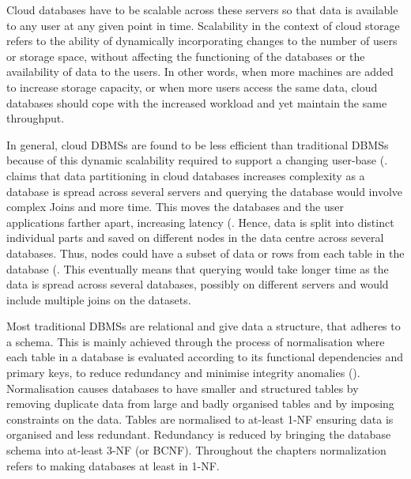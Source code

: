 Cloud databases have to be scalable across these servers so that data is
available to any user at any given point in time.  Scalability in the context of
cloud storage refers to the ability of dynamically incorporating changes to the
number of users or storage space,   without affecting the functioning of the
databases or the availability of data to the users.  In other words,   when more
machines are added to increase storage capacity,   or when more users access the
same data,   cloud databases should cope with the increased workload and yet
maintain the same throughput.

In general,   cloud \acp{DBMS} are found to be less efficient than traditional
\acp{DBMS} because of this dynamic scalability required to support a changing
user-base (.   claims that data
partitioning in cloud databases increases complexity as a database is spread
across several servers and querying the database would involve complex Joins and
more time.  This moves the databases and the user applications farther apart,
increasing latency (.  Hence,   data is split into
distinct individual parts and saved on different nodes in the data centre across
several databases.
Thus,   nodes could have a subset of data or rows from each table in the
database (. This eventually means that querying
would take longer time as the data is spread across several databases,  
possibly on different servers and would include multiple joins on the datasets.

Most traditional \acp{DBMS} are relational and give data a structure,   that
adheres to a schema.  This is mainly achieved through the process of
normalisation where each table in a database is evaluated according to its
functional dependencies and primary keys,   to reduce redundancy and minimise
integrity anomalies ().  Normalisation causes databases to
have smaller and structured tables by removing duplicate data from large and
badly organised tables and by imposing constraints on the data.  Tables are
normalised to at-least \ac{1-NF} ensuring data is organised and less redundant.
Redundancy is reduced by bringing the database schema into at-least \ac{3-NF}
(or \ac{BCNF}).
Throughout the chapters normalization refers to making databases at least in
\ac{1-NF}.

